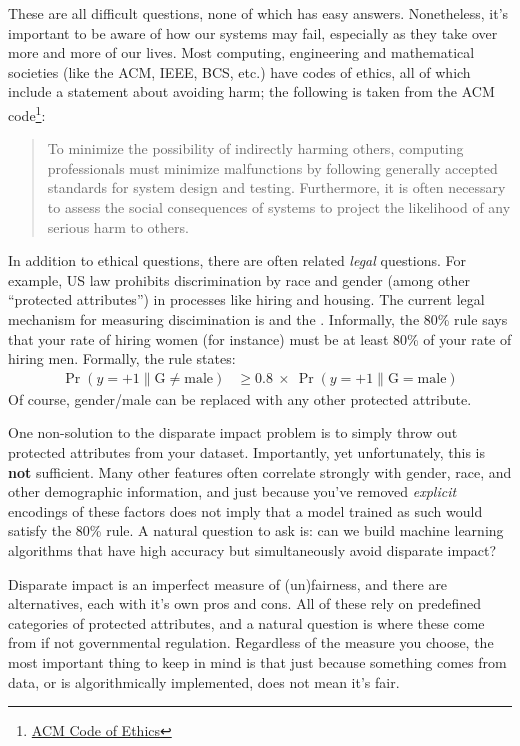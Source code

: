 These are all difficult questions, none of which has easy answers.
Nonetheless, it's important to be aware of how our systems may fail, especially as they take over more and more of our lives.
Most computing, engineering and mathematical societies (like the ACM, IEEE, BCS, etc.) have codes of ethics, all of which include a statement about avoiding harm; the following is taken from the ACM code\footnote{\href{https://www.acm.org/about-acm/acm-code-of-ethics-and-professional-conduct}{ACM Code of Ethics}}:
\begin{quote}
  To minimize the possibility of indirectly harming others, computing professionals must minimize malfunctions by following generally accepted standards for system design and testing. Furthermore, it is often necessary to assess the social consequences of systems to project the likelihood of any serious harm to others.
\end{quote}

In addition to ethical questions, there are often related \emph{legal} questions.
For example, US law prohibits discrimination by race and gender (among other ``protected attributes'') in processes like hiring and housing.
The current legal mechanism for measuring discimination is  and the .
Informally, the 80\% rule says that your rate of hiring women (for instance) must be at least 80\% of your rate of hiring men.
Formally, the rule states:
\begin{align}
                    \Pr(y = +1 \| \text{G} \neq \text{male})
& \geq 0.8 ~\times~ \Pr(y = +1 \| \text{G} =    \text{male})
\end{align}
Of course, gender/male can be replaced with any other protected attribute.

One non-solution to the disparate impact problem is to simply throw out protected attributes from your dataset.
Importantly, yet unfortunately, this is \textbf{not} sufficient.
Many other features often correlate strongly with gender, race, and other demographic information, and just because you've removed \emph{explicit} encodings of these factors does not imply that a model trained as such would satisfy the 80\% rule.
A natural question to ask is: can we build machine learning algorithms that have high accuracy but simultaneously avoid disparate impact?

Disparate impact is an imperfect measure of (un)fairness, and there are alternatives, each with it's own pros and cons.
All of these rely on predefined categories of protected attributes, and a natural question is where these come from if not governmental regulation.
Regardless of the measure you choose, the most important thing to keep in mind is that just because something comes from data, or is algorithmically implemented, does not mean it's fair.


